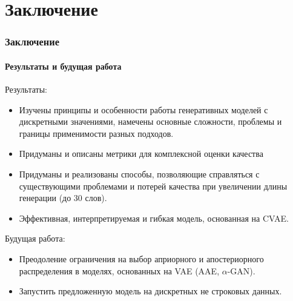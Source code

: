 \documentclass[10pt]{beamer}
\begin{document}
\section{Заключение}
\begin{frame}
\frametitle{Заключение}
\framesubtitle{Результаты и будущая работа}


Результаты:
\begin{itemize}
    \item Изучены принципы и особенности работы генеративных моделей с дискретными значениями, намечены основные сложности, проблемы и границы применимости разных подходов.
    \item Придуманы и описаны метрики для комплексной оценки качества
    \item Придуманы и реализованы способы, позволяющие справляться с существующими проблемами и потерей качества при увеличении длины генерации (до $30$ слов).
    \item Эффективная, интерпретируемая и гибкая модель, основанная на CVAE.
\end{itemize}

Будущая работа:
\begin{itemize}
    \item Преодоление ограничения на выбор априорного и апостериорного распределения в моделях, основанных на VAE (AAE, $\alpha$-GAN).
    \item Запустить предложенную модель на дискретных не строковых данных.
\end{itemize}

\end{frame}
\end{document}
